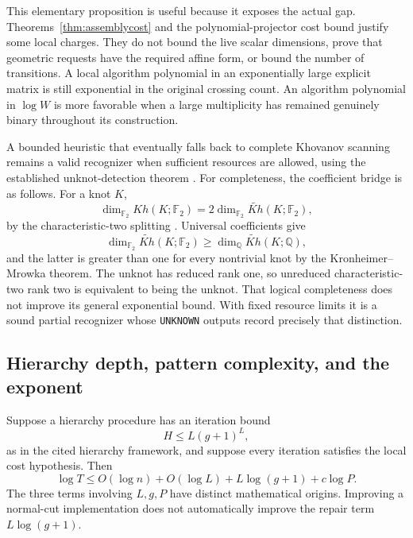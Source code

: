 \documentclass[11pt,a4paper]{article}
\theoremstyle{definition}\newtheorem{definition}[theorem]{Definition}
\theoremstyle{remark}\newtheorem{remark}[theorem]{Remark}
\newcommand{\F}{\mathbb F_2}
\newcommand{\code}[1]{\nolinkurl{#1}}
\begin{document}
This elementary proposition is useful because it exposes the actual gap.
Theorems~\ref{thm:assemblycost} and the polynomial-projector cost bound
justify some local charges. They do not bound the live scalar dimensions,
prove that geometric requests have the required affine form, or bound the
number of transitions. A local algorithm polynomial in an exponentially
large explicit matrix is still exponential in the original crossing count.
An algorithm polynomial in $\log W$ is more favorable when a large
multiplicity has remained genuinely binary throughout its construction.

A bounded heuristic that eventually falls back to complete Khovanov
scanning remains a valid recognizer when sufficient resources are allowed,
using the established unknot-detection theorem \cite{kronheimer-mrowka}.
For completeness, the coefficient bridge is as follows. For a knot $K$,
\[
 \dim_{\F}Kh(K;\F)=2\dim_{\F}\widetilde{Kh}(K;\F),
\]
by the characteristic-two splitting \cite[Corollary 3.2.C]{shumakovitch}.
Universal coefficients give
\[
 \dim_{\F}\widetilde{Kh}(K;\F)\ge
 \dim_{\mathbb Q}\widetilde{Kh}(K;\mathbb Q),
\]
and the latter is greater
than one for every nontrivial knot by the Kronheimer--Mrowka theorem.
The unknot has reduced rank one, so unreduced characteristic-two rank two
is equivalent to being the unknot.
That logical completeness does not improve its general exponential bound.
With fixed resource limits it is a sound partial recognizer whose
\code{UNKNOWN} outputs record precisely that distinction.

\subsection{Hierarchy depth, pattern complexity, and the exponent}

Suppose a hierarchy procedure has an iteration bound
\begin{equation}\label{eq:hierarchycount}
 H\le L(g+1)^L,
\end{equation}
as in the cited hierarchy framework, and suppose every iteration satisfies
the local cost hypothesis. Then
\begin{equation}\label{eq:exponentbudget}
 \log T\le O(\log n)+O(\log L)+L\log(g+1)+c\log P.
\end{equation}
The three terms involving $L,g,P$ have distinct mathematical origins.
Improving a normal-cut implementation does not automatically improve the
repair term $L\log(g+1)$.
\end{document}
